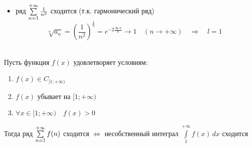 \begin{Proof}
\begin{enumerate}
\begin{itemize}
            \item ряд $\sum\limits_{n = 1}^{+\infty}{\frac{1}{n^2}}$ сходится (т.к. гармонический ряд) 
            \[
                \sqrt[n]{a_n} = (\frac{1}{n^2})^{\frac{1}{n}} = e^{-2\frac{\ln n}{n}} \to 1 \quad (n \to +\infty) \quad \Rightarrow \quad l = 1
            \]
		\end{itemize}
	\end{enumerate}
\end{Proof}

\begin{Th}~\\
	Пусть функция $f(x)$ удовлетворяет условиям:
	\begin{enumerate}
		\item $f(x) \in C_{[1;+\infty)}$
		\item $f(x)$ убывает на $[1;+\infty)$
		\item $\forall x \in [1; + \infty) \quad f(x) > 0$
	\end{enumerate}
	Тогда ряд $\sum\limits_{n = 1}^{+\infty}{f(n)}$ сходится $\Leftrightarrow$ несобственный интеграл $\int\limits_{1}^{+\infty}f(x)\,dx$ сходится
\end{Th}

\pagebreak


